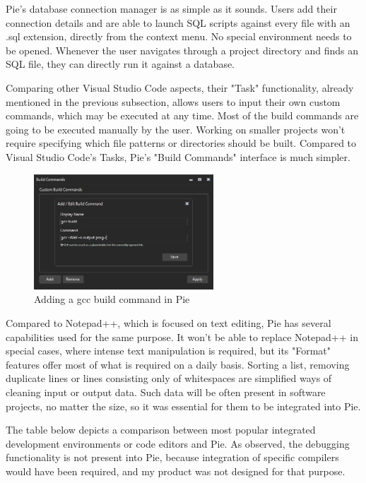 Pie's database connection manager is as simple as it sounds. Users add their connection details and are able to launch SQL scripts against every file with an .sql extension, directly from the context menu. No special environment needs to be opened. Whenever the user navigates through a project directory and finds an SQL file, they can directly run it against a database.

Comparing other Visual Studio Code aspects, their "Task" functionality, already mentioned in the previous subsection, allows users to input their own custom commands, which may be executed at any time. Most of the build commands are going to be executed manually by the user. Working on smaller projects won't require specifying which file patterns or directories should be built. Compared to Visual Studio Code's Tasks, Pie's "Build Commands" interface is much simpler.

\begin{figure}[H]
\centering
\includegraphics[width=0.6\textwidth]{images/pie-build-commands.png}
\caption{Adding a gcc build command in Pie}
\label{fig:fig2,1.}
\end{figure}

Compared to Notepad++, which is focused on text editing, Pie has several capabilities used for the same purpose. It won't be able to replace Notepad++ in special cases, where intense text manipulation is required, but its "Format" features offer most of what is required on a daily basis. Sorting a list, removing duplicate lines or lines consisting only of whitespaces are simplified ways of cleaning input or output data. Such data will be often present in software projects, no matter the size, so it was essential for them to be integrated into Pie.

The table below depicts a comparison between most popular integrated development environments or code editors and Pie. As observed, the debugging functionality is not present into Pie, because integration of specific compilers would have been required, and my product was not designed for that purpose.

